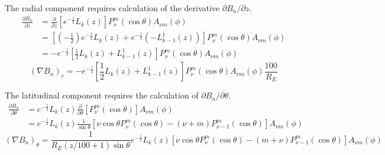 \documentclass[12pt,letterpaper]{article}
\begin{document}
  The radial component requires calculation of the derivative \(\partial B_n/\partial z\).
  \begin{align}
    \frac{\partial B_n}{\partial z} &= \frac{\partial}{\partial z}\left[e^{-\frac{z}{2}}L_k(z)\right]P_\nu^m(\cos\theta)A_{\nu m}(\phi) \\
     &= \left[\left(-\frac{1}{2}\right)e^{-\frac{z}{2}}L_k(z) + e^{-\frac{z}{2}}\left(-L_{k-1}^1(z)\right)\right]P_\nu^m(\cos\theta)A_{\nu m}(\phi) \\
     &= -e^{-\frac{z}{2}}\left[\frac{1}{2}L_k(z)+L_{k-1}^1(z)\right]P_\nu^m(\cos\theta)A_{\nu m}(\phi)
  \end{align}
  \begin{equation}
    (\nabla B_n)_r = -e^{-\frac{z}{2}}\left[\frac{1}{2}L_k(z)+L_{k-1}^1(z)\right]P_\nu^m(\cos\theta)A_{\nu m}(\phi)\frac{100}{R_E}
  \end{equation}

  The latitudinal component requires the calculation of \(\partial B_n/\partial \theta\).
  \begin{align}
    \frac{\partial B_n}{\partial \theta} &= e^{-\frac{z}{2}}L_k(z)\frac{\partial}{\partial \theta}\left[P_\nu^m(\cos\theta)\right]A_{\nu m}(\phi) \\
     &= e^{-\frac{z}{2}}L_k(z)\frac{1}{\sin\theta}\left[\nu\cos\theta P_\nu^m(\cos\theta) - (\nu+m)P_{\nu-1}^m(\cos\theta)\right]A_{\nu m}(\phi)
  \end{align}
  \begin{equation}
    (\nabla B_n)_\theta = \frac{1}{R_E(z/100+1)\sin\theta}e^{-\frac{z}{2}}L_k(z)\left[\nu\cos\theta P_\nu^m(\cos\theta)-(m+\nu)P_{\nu-1}^m(\cos\theta)\right]A_{\nu m}(\phi)
  \end{equation}
\end{document}
